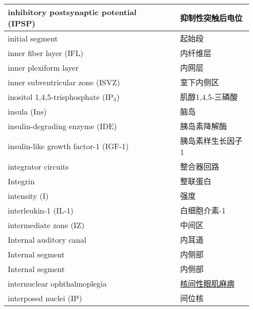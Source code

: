 \begin{longtable}{lll}
	\midrule
	inhibitory postsynaptic potential (IPSP)  && 抑制性突触后电位  \\
	
	\midrule
	initial segment && 起始段  \\
	
	\midrule
	inner fiber layer (IFL)   && 内纤维层  \\
	
	\midrule
	inner plexiform layer   && 内网层  \\
	
	\midrule
	inner subventricular zone (ISVZ)   && 室下内侧区  \\
	
	\midrule
	inositol 1,4,5-trisphosphate  (IP$_3$) && 肌醇1,4,5-三磷酸  \\
	
	\midrule
	insula (Ins)   && 脑岛  \\
	
	\midrule
	insulin-degrading enzyme (IDE)   && 胰岛素降解酶  \\
	
	\midrule
	insulin-like growth factor-1 (IGF-1)   && 胰岛素样生长因子1  \\
	
	\midrule
	integrator circuits  && 整合器回路  \\
	
	\midrule
	Integrin  && 整联蛋白  \\
	
	\midrule
	intensity (I)  && 强度  \\
	
	\midrule
	interleukin-1 (IL-1) && 白细胞介素-1  \\
	
	\midrule
	intermediate zone (IZ)  && 中间区  \\
	
	\midrule
	Internal auditory canal   && 内耳道  \\
	
	\midrule
	Internal segment  && 内侧部  \\
	
	\midrule
	Internal segment  && 内侧部  \\
	
	\midrule
	internuclear ophthalmoplegia  && \href{https://chuangshi.qq.com/read/27611642/12}{核间性眼肌麻痹}  \\
	
	\midrule
	interposed nuclei (IP)  && 间位核  \\
	

\end{longtable}
